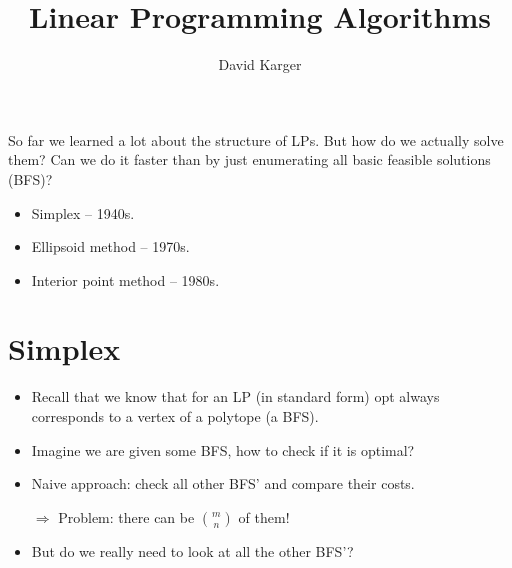 \documentclass{article}
\title{Linear Programming Algorithms}
\author{David Karger}
\begin{document}
So far we learned a lot about the structure of LPs. But how do we actually solve them?
Can we do it faster than by just enumerating all basic feasible solutions (BFS)?

\begin{itemize}
\item Simplex -- 1940s.
\item Ellipsoid method -- 1970s.
\item Interior point method -- 1980s. 
\end{itemize}

\section{Simplex}

\begin{itemize}
\item Recall that we know that for an LP (in standard form) opt always corresponds to a vertex of a polytope (a BFS).
\item Imagine we are given some BFS, how to check if it is optimal? 
\item Naive approach: check all other BFS' and compare their costs. 

$\Rightarrow$ Problem: there can be $m \choose n$ of them! 

\item But do we really need to look at all the other BFS'?

\end{itemize}
\end{document}
